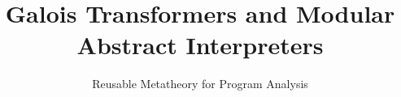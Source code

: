 \documentclass[nocopyrightspace,preprint,10pt]{sigplanconf}
\begin{document}

\setlength{\pdfpageheight}{\paperheight}
\setlength{\pdfpagewidth}{\paperwidth}


%





\setlength{\abovedisplayskip}{0em}
\setlength{\belowdisplayskip}{0em}
\setlength{\abovedisplayshortskip}{0em}
\setlength{\belowdisplayshortskip}{0em}

\title{Galois Transformers and Modular Abstract Interpreters}
\subtitle{Reusable Metatheory for Program Analysis}
\authorinfo{}{}{}
\maketitle
\end{document}
